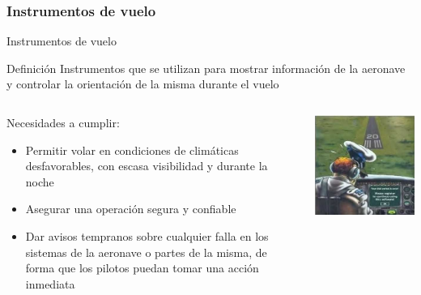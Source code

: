 
\subsubsection{Instrumentos de vuelo}
\label{sec:instrumentos.de.vuelo}


\begin{frame}{Instrumentos de vuelo}

  \begin{block}{Definici\'on}
    Instrumentos que se utilizan para mostrar informaci\'on de la
    aeronave y controlar la orientaci\'on de la misma durante el vuelo
  \end{block}

  \begin{columns}{2}

    \begin{column}{0.5\textwidth}
{\small
  \begin{block}{    Necesidades a cumplir:}
    \begin{itemize}
    \item Permitir volar en condiciones de clim\'aticas desfavorables, 
	con escasa visibilidad y durante la noche
    \item Asegurar una operaci\'on segura y confiable
    \item Dar avisos tempranos sobre cualquier falla en los sistemas
      de la aeronave o partes de la misma, de forma que los pilotos
      puedan tomar una acci\'on inmediata
    \end{itemize}
  \end{block}
}
\end{column}
    \begin{column}{0.5\textwidth}
 \includegraphics[width=\linewidth]{imagenes/1.1.introduccion/problema_soft.jpg} \\
    \end{column}
  \end{columns}

\end{frame}

